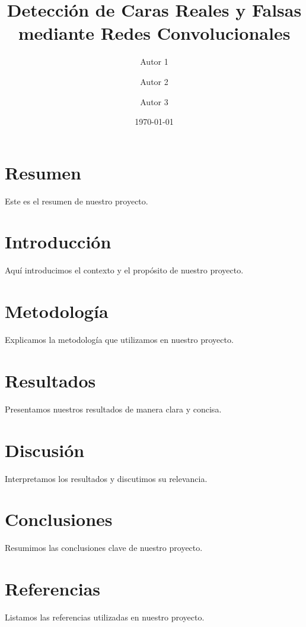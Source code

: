 \documentclass{article}
\title{Detección de Caras Reales y Falsas mediante Redes Convolucionales}
\author{Autor 1 \and Autor 2 \and Autor 3}
\date{\today}
\begin{document}
\maketitle

\section{Resumen}
Este es el resumen de nuestro proyecto.

\section{Introducción}
Aquí introducimos el contexto y el propósito de nuestro proyecto.

\section{Metodología}
Explicamos la metodología que utilizamos en nuestro proyecto.

\section{Resultados}
Presentamos nuestros resultados de manera clara y concisa.

\section{Discusión}
Interpretamos los resultados y discutimos su relevancia.

\section{Conclusiones}
Resumimos las conclusiones clave de nuestro proyecto.

\section{Referencias}
Listamos las referencias utilizadas en nuestro proyecto.
\end{document}
